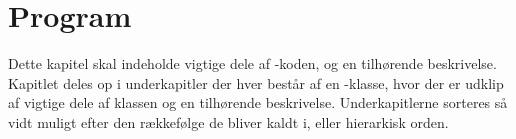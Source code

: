 \chapter{Program}
Dette kapitel skal indeholde vigtige dele af \CSharp-koden, og en tilhørende beskrivelse. Kapitlet deles op i underkapitler der hver består af en \CSharp-klasse, hvor der er udklip af vigtige dele af klassen og en tilhørende beskrivelse. Underkapitlerne sorteres så vidt muligt efter den rækkefølge de bliver kaldt i, eller hierarkisk orden.